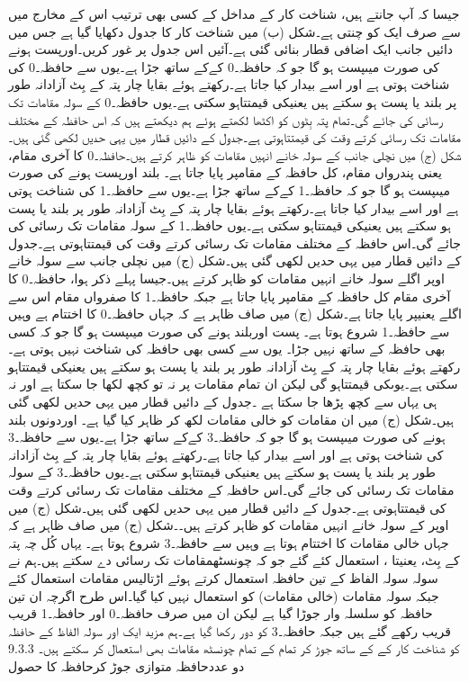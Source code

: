 	جیسا کہ آپ جانتے ہیں، شناخت کار کے مداخل کے کسی بھی ترتیب اس کے مخارج میں سے صرف ایک کو چنتی ہے۔شکل (ب) میں شناخت کار کا جدول دکھایا گیا ہے جس میں دائیں جانب ایک اضافی قطار بنائی گئی ہے۔آئیں اس جدول پر غور کریں۔اورپست ہونے کی صورت میںپست ہو گا جو کہ حافظہ۔0 کےکے ساتھ جڑا ہے۔یوں سے حافظہ۔0 کی شناخت ہوتی ہے اور اسے بیدار کیا جاتا ہے۔رکھتے ہوئے بقایا چار پتہ کے بِٹ آزادانہ طور پر بلند یا پست ہو سکتے ہیں یعنیکی قیمتتاہو سکتی ہے۔یوں حافظہ۔0 کے سولہ مقامات تک رسائی کی جائے گی۔تمام پتہ بِٹوں کو اکٹھا لکھتے ہوئے ہم دیکھتے ہیں کہ اس حافظہ کے مختلف مقامات تک رسائی کرتے وقت کی قیمتتاہوتی ہے۔جدول کے دائیں قطار میں یہی حدیں لکھی گئی ہیں۔شکل (ج) میں نچلی جانب کے سولہ خانے انہیں مقامات کو ظاہر کرتے ہیں۔حافظہ۔0 کا آخری مقام، یعنی پندرواں مقام، کل حافظہ کے مقامپر پایا جاتا ہے۔
	بلند اورپست ہونے کی صورت میںپست ہو گا جو کہ حافظہ۔1 کےکے ساتھ جڑا ہے۔یوں سے حافظہ۔1 کی شناخت ہوتی ہے اور اسے بیدار کیا جاتا ہے۔رکھتے ہوئے بقایا چار پتہ کے بِٹ آزادانہ طور پر بلند یا پست ہو سکتے ہیں یعنیکی قیمتتاہو سکتی ہے۔یوں حافظہ۔1 کے سولہ مقامات تک رسائی کی جائے گی۔اس حافظہ کے مختلف مقامات تک رسائی کرتے وقت کی قیمتتاہوتی ہے۔جدول کے دائیں قطار میں یہی حدیں لکھی گئی ہیں۔شکل (ج) میں نچلی جانب سے سولہ خانے اوپر اگلے سولہ خانے انہیں مقامات کو ظاہر کرتے ہیں۔جیسا پہلے ذکر ہوا، حافظہ۔0 کا آخری مقام کل حافظہ کے مقامپر پایا جاتا ہے جبکہ حافظہ۔1 کا صفرواں مقام اس سے اگلے یعنیپر پایا جاتا ہے۔شکل (ج) میں صاف ظاہر ہے کہ جہاں حافظہ۔0 کا اختتام ہے وہیں سے حافظہ۔1 شروع ہوتا ہے۔
	پست اوربلند ہونے کی صورت میںپست ہو گا جو کہ کسی بھی حافظہ کے ساتھ نہیں جڑا۔ یوں سے کسی بھی حافظہ کی شناخت نہیں ہوتی ہے۔رکھتے ہوئے بقایا چار پتہ کے بِٹ آزادانہ طور پر بلند یا پست ہو سکتے ہیں یعنیکی قیمتتاہو سکتی ہے۔یوںکی قیمتتاہو گی لیکن ان تمام مقامات پر نہ تو کچھ لکھا جا سکتا ہے اور نہ ہی یہاں سے کچھ پڑھا جا سکتا ہے ۔جدول کے دائیں قطار میں یہی حدیں لکھی گئی ہیں۔شکل (ج) میں ان مقامات کو خالی مقامات لکھ کر ظاہر کیا گیا ہے۔	
	 اوردونوں بلند ہونے کی صورت میںپست ہو گا جو کہ حافظہ۔3 کےکے ساتھ جڑا ہے۔یوں سے حافظہ۔3 کی شناخت ہوتی ہے اور اسے بیدار کیا جاتا ہے۔رکھتے ہوئے بقایا چار پتہ کے بِٹ آزادانہ طور پر بلند یا پست ہو سکتے ہیں یعنیکی قیمتتاہو سکتی ہے۔یوں حافظہ۔3 کے سولہ مقامات تک رسائی کی جائے گی۔اس حافظہ کے مختلف مقامات تک رسائی کرتے وقت کی قیمتتاہوتی ہے۔جدول کے دائیں قطار میں یہی حدیں لکھی گئی ہیں۔شکل (ج) میں اوپر کے سولہ خانے انہیں مقامات کو ظاہر کرتے ہیں۔۔شکل (ج) میں صاف ظاہر ہے کہ جہاں خالی مقامات کا اختتام ہوتا ہے وہیں سے حافظہ۔3  شروع ہوتا ہے۔
	یہاں کُل چہ پتہ کے بِٹ، یعنیتا ، استعمال کئے گئے جو کہ چونسٹھمقامات تک رسائی دے سکتے ہیں۔ہم نے سولہ سولہ الفاظ کے تین حافظہ استعمال کرتے ہوئے اڑتالیس مقامات استعمال کئے جبکہ سولہ مقامات (خالی مقامات) کو استعمال نہیں کیا گیا۔اس طرح اگرچہ ان تین حافظہ کو سلسلہ وار جوڑا گیا ہے لیکن ان میں صرف حافظہ۔0 اور حافظہ۔1 قریب قریب رکھے گئے ہیں جبکہ حافظہ۔3 کو دور رکھا گیا ہے۔ہم مزید ایک اور سولہ الفاظ کے حافظہ کو شناخت کار کے کے ساتھ جوڑ کر تمام کے تمام چونسٹھ مقامات بھی استعمال کر سکتے ہیں۔
9.3.3 دو عددحافظہ متوازی جوڑ کرحافظہ کا حصول


